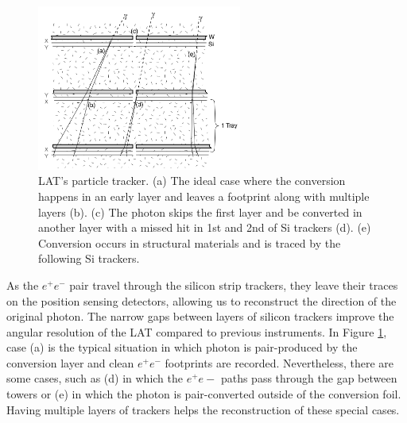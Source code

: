 \begin{figure}[h!]
    \centering
    \includegraphics[width=0.6\textwidth]{content/background/figures/fermi_tracker.png}
    \caption{
        LAT's particle tracker.
        (a) The ideal case where the conversion happens in an early
        layer and leaves a footprint along with multiple layers (b).
        (c) The photon skips the first layer and be converted in another layer
        with a missed hit in 1st and 2nd of Si trackers (d).
        (e) Conversion occurs in structural materials and is traced 
        by the following Si trackers.
        \citep{FermiLAT}
    }
    \label{fig:fermi_tracker}
\end{figure}

As the $e^+e^-$ pair travel through the silicon strip trackers,
they leave their traces on the position sensing detectors,
allowing us to reconstruct the direction of the original photon.
The narrow gaps between layers of silicon trackers improve the
angular resolution of the LAT compared to previous instruments.
In Figure \ref{fig:fermi_tracker},
case (a) is the typical situation in which photon
is pair-produced by the conversion layer and clean $e^+e^-$
footprints are recorded. Nevertheless, there are some cases,
such as (d) in which the $e^+e-$ paths pass through the gap
between towers or (e) in which the photon is pair-converted
outside of the conversion foil. Having multiple layers of
trackers helps the reconstruction of these special cases.

